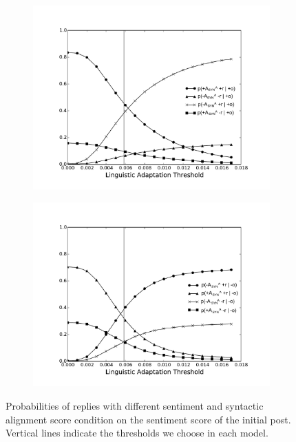 \documentclass[man,biblatex,floatsintext]{apa6}
\newcommand{\up}{\vspace*{-12pt}}
\begin{document}
\begin{figure}[!htb]
\begin{subfigure}{.5\textwidth}
  \centering
  \includegraphics[width=\linewidth]{Figures/SynAposi_new_rob_New_Enlarge.pdf}
  \caption{\label{fig:ProbSynPoso}}
\end{subfigure}%
\begin{subfigure}{.5\textwidth}
  \centering
  \includegraphics[width=\linewidth]{Figures/SynAnegi_new_rob_New_Enlarge.pdf}
  \caption{\label{fig:ProbSynNego}}
\end{subfigure}%
\caption{Probabilities of replies with different sentiment and syntactic alignment score condition on the sentiment score of the initial post. Vertical lines indicate the thresholds we choose in each model.}
\label{fig:Probability_Change_Syn}
\up
\end{figure}
\end{document}
